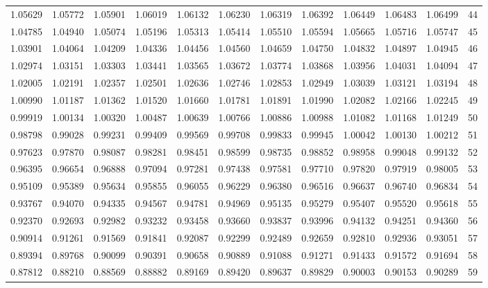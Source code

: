 \begin{center}
\begin{tabular}{|rrrrrrrrrrr|r|}
1.05629&1.05772&1.05901&1.06019&1.06132&1.06230&1.06319&1.06392&1.06449&1.06483&1.06499&44\\[5pt]
1.04785&1.04940&1.05074&1.05196&1.05313&1.05414&1.05510&1.05594&1.05665&1.05716&1.05747&45\\
1.03901&1.04064&1.04209&1.04336&1.04456&1.04560&1.04659&1.04750&1.04832&1.04897&1.04945&46\\
1.02974&1.03151&1.03303&1.03441&1.03565&1.03672&1.03774&1.03868&1.03956&1.04031&1.04094&47\\
1.02005&1.02191&1.02357&1.02501&1.02636&1.02746&1.02853&1.02949&1.03039&1.03121&1.03194&48\\
1.00990&1.01187&1.01362&1.01520&1.01660&1.01781&1.01891&1.01990&1.02082&1.02166&1.02245&49\\[5pt]
0.99919&1.00134&1.00320&1.00487&1.00639&1.00766&1.00886&1.00988&1.01082&1.01168&1.01249&50\\
0.98798&0.99028&0.99231&0.99409&0.99569&0.99708&0.99833&0.99945&1.00042&1.00130&1.00212&51\\
0.97623&0.97870&0.98087&0.98281&0.98451&0.98599&0.98735&0.98852&0.98958&0.99048&0.99132&52\\
0.96395&0.96654&0.96888&0.97094&0.97281&0.97438&0.97581&0.97710&0.97820&0.97919&0.98005&53\\
0.95109&0.95389&0.95634&0.95855&0.96055&0.96229&0.96380&0.96516&0.96637&0.96740&0.96834&54\\[5pt]
0.93767&0.94070&0.94335&0.94567&0.94781&0.94969&0.95135&0.95279&0.95407&0.95520&0.95618&55\\
0.92370&0.92693&0.92982&0.93232&0.93458&0.93660&0.93837&0.93996&0.94132&0.94251&0.94360&56\\
0.90914&0.91261&0.91569&0.91841&0.92087&0.92299&0.92489&0.92659&0.92810&0.92936&0.93051&57\\
0.89394&0.89768&0.90099&0.90391&0.90658&0.90889&0.91088&0.91271&0.91433&0.91572&0.91694&58\\
0.87812&0.88210&0.88569&0.88882&0.89169&0.89420&0.89637&0.89829&0.90003&0.90153&0.90289&59\\
\hline\end{tabular}
\end{center}
